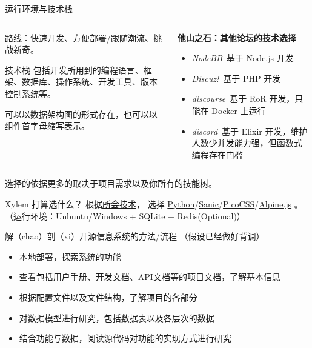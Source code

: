 \documentclass[UTF8]{ctexbeamer}
\begin{document}
\begin{frame}{运行环境与技术栈}
\begin{columns}
\begin{column}{0.44\textwidth}
路线：快速开发、方便部署/跟随潮流、挑战新奇。
\begin{block}{技术栈\footnotemark[1]}
包括开发所用到的编程语言、框架、数据库、操作系统、开发工具、版本控制系统等。

可以以数据架构图的形式存在，也可以以组件首字母缩写表示。
\end{block}
\end{column}
\begin{column}{0.52\textwidth}
\textbf{他山之石：其他论坛的技术选择}

\begin{itemize}
  \item \emph{NodeBB}~基于 Node.js 开发
  \item \emph{Discuz!}~基于 PHP 开发
  \item \emph{discourse}~基于 RoR 开发，只能在 Docker 上运行
  \item \emph{discord}~基于 Elixir 开发，维护人数少并发能力强，但函数式编程存在门槛
\end{itemize}
\end{column}
\end{columns}
选择的依据更多的取决于项目需求以及你所有的技能树。

Xylem 打算选什么？
根据\href{https://ges233.github.io/about}{所会技术}，
选择 \href{https://www.python.org/}{Python}/\href{https://sanic.dev/}{Sanic}/\href{https://picocss.com}{PicoCSS}/\href{https://alpinejs.dev/}{Alpine.js} 。
（运行环境：Unbuntu/Windows + SQLite + Redis(Optional)）

\end{frame}

\begin{frame}{解（chao）剖（xi）开源信息系统的方法/流程}
（假设已经做好背调）

\begin{itemize}
  \item 本地部署，探索系统的功能
  \item 查看包括用户手册、开发文档、API文档等的项目文档，了解基本信息
  \item 根据配置文件以及文件结构，了解项目的各部分
  \item 对数据模型进行研究，包括数据表以及各层次的数据
  \item 结合功能与数据，阅读源代码对功能的实现方式进行研究
\end{itemize}
\end{frame}
\end{document}
